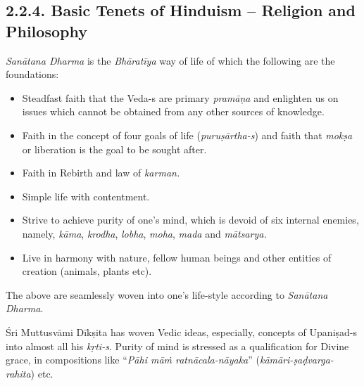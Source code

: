 \subsection*{2.2.4. Basic Tenets of Hinduism – Religion and Philosophy}

\textit{Sanātana Dharma} is the \textit{Bhāratīya} way of life of which the following are the foundations:

\vspace{-.4cm}

\begin{itemize}
\itemsep=0pt

 \item Steadfast faith that the Veda-s are primary \textit{pramāṇa} and enlighten us on issues which cannot be obtained from any other sources of knowledge.

 \item Faith in the concept of four goals of life (\textit{puruṣārtha-s}) and faith that \textit{mokṣa} or liberation is the goal to be sought after.

 \item Faith in Rebirth and law of \textit{karman.}

 \item Simple life with contentment.

 \item Strive to achieve purity of one’s mind, which is devoid of six internal enemies, namely, \textit{kāma}, \textit{krodha}, \textit{lobha}, \textit{moha}, \textit{mada} and \textit{mātsarya.}

 \item Live in harmony with nature, fellow human beings and other entities of creation (animals, plants etc).

\end{itemize}

\vspace{-.4cm}

The above are seamlessly woven into one’s life-style according to \textit{Sanātana Dharma}.

Śri Muttusvāmi Dīkṣita has woven Vedic ideas, especially, concepts of Upaniṣad-s into almost all his \textit{kṛti-s}. Purity of mind is stressed as a qualification for Divine grace, in compositions like “\textit{Pāhi māṁ ratnācala-nāyaka}” (\textit{kāmāri-ṣaḍvarga-rahita}) etc.

